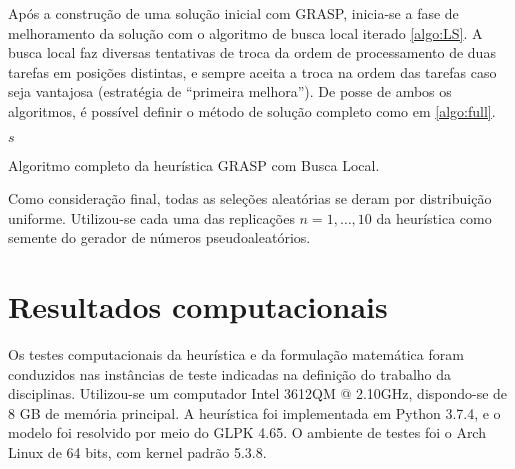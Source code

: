 \documentclass[12pt]{article}
\begin{document}
Após a construção de uma solução inicial com GRASP, inicia-se a fase de
melhoramento da solução com o algoritmo de busca local iterado \ref{algo:LS}.
A busca local faz diversas tentativas de troca da ordem de processamento de
duas tarefas em posições distintas, e sempre aceita a troca na ordem das
tarefas caso seja vantajosa (estratégia de ``primeira melhora''). De posse de
ambos os algoritmos, é possível definir o método de solução completo como em
\ref{algo:full}.

\begin{algorithm}[H]
   \footnotesize
   \Return $s$
   \caption{Algoritmo completo da heurística GRASP com Busca Local.}
   \label{algo:full}
\end{algorithm}

Como consideração final, todas as seleções aleatórias se deram
por distribuição uniforme. Utilizou-se cada uma das replicações 
$n=1, \dots, 10$ da heurística como semente do gerador de números
pseudoaleatórios.

\section{Resultados computacionais}

Os testes computacionais da heurística e da formulação matemática foram
conduzidos nas instâncias de teste indicadas na definição do trabalho da
disciplinas. Utilizou-se um computador Intel 3612QM @ 2.10GHz, dispondo-se de
8 GB de memória principal. A heurística foi implementada em Python 
3.7.4, e o modelo foi resolvido por meio do GLPK 4.65. O ambiente de testes foi
o Arch Linux de 64 bits, com kernel padrão 5.3.8.
\end{document}
